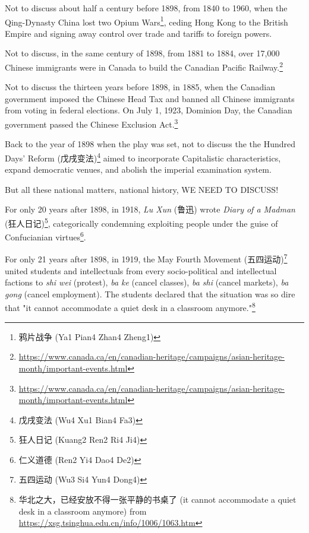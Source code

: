 \documentclass[8pt]{article}
\begin{document}
Not to discuss about half a century before 1898, from 1840 to 1960, when the Qing-Dynasty China lost two Opium Wars\footnote{鸦片战争 (Ya1 Pian4 Zhan4 Zheng1)}, ceding Hong Kong to the British Empire and signing away control over trade and tariffs to foreign powers.

Not to discuss, in the same century of 1898, from 1881 to 1884, over 17,000 Chinese immigrants were in Canada to build the Canadian Pacific Railway.\footnote{\href{https://www.canada.ca/en/canadian-heritage/campaigns/asian-heritage-month/important-events.html}{https://www.canada.ca/en/canadian-heritage/campaigns/asian-heritage-month/important-events.html}}

Not to discuss the thirteen years before 1898, in 1885, when the Canadian government imposed the Chinese Head Tax and banned all Chinese immigrants from voting in federal elections. On July 1, 1923, Dominion Day, the Canadian government passed the Chinese Exclusion Act.\footnote{\href{https://www.canada.ca/en/canadian-heritage/campaigns/asian-heritage-month/important-events.html}{https://www.canada.ca/en/canadian-heritage/campaigns/asian-heritage-month/important-events.html}}


Back to the year of 1898 when the play was set, not to discuss the the Hundred Days' Reform (戊戌变法)\footnote{戊戌变法 (Wu4 Xu1 Bian4 Fa3)} aimed to incorporate Capitalistic characteristics, expand democratic venues, and abolish the imperial examination system.

But all these national matters, national history, WE NEED TO DISCUSS!

For only 20 years after 1898, in 1918, \textit{Lu Xun} (鲁迅) wrote \textit{Diary of a Madman} (狂人日记)\footnote{狂人日记 (Kuang2 Ren2 Ri4 Ji4)}, categorically condemning exploiting people under the guise of Confucianian virtues\footnote{仁义道德 (Ren2 Yi4 Dao4 De2)}.

For only 21 years after 1898, in 1919, the May Fourth Movement (五四运动)\footnote{五四运动 (Wu3 Si4 Yun4 Dong4)} united students and intellectuals from every socio-political and intellectual factions to \textit{shi wei} (protest), \textit{ba ke} (cancel classes), \textit{ba shi} (cancel markets), \textit{ba gong} (cancel employment). The students declared that the situation was so dire that "it cannot accommodate a quiet desk in a classroom anymore."\footnote{华北之大，已经安放不得一张平静的书桌了 (it cannot accommodate a quiet desk in a classroom anymore) from \href{https://xsg.tsinghua.edu.cn/info/1006/1063.htm}{https://xsg.tsinghua.edu.cn/info/1006/1063.htm}}
\end{document}
